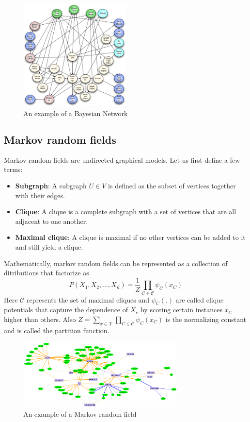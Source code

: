 \documentclass[12pt]{article}
\begin{document}
\begin{figure}[H]
  \centering
    \includegraphics[width=0.50\textwidth]{fig1.jpg}
    \caption{An example of a Bayesian Network\cite{fig1}}
    \label{BN}
\end{figure}

\subsection{Markov random fields}
Markov random fields are undirected graphical models. Let us first define a few terms:
\begin{itemize}
\item \textbf{Subgraph}: A subgraph $U\in V$ is defined as the subset of vertices together with their edges.
\item \textbf{Clique}: A clique is a complete subgraph with a set of vertices that are all adjacent to one another.
\item \textbf{Maximal clique}: A clique is maximal if no other vertices can be added to it and still yield a clique.
\end{itemize}
Mathematically, markov random fields can be represented as a collection of ditributions that factorize as \[P(X_1,X_2,..., X_n)=\dfrac{1}{Z}\prod\limits_{C\in\mathcal{C}}\psi_C(x_C)\] Here $\mathcal{C}$ represents the set of maximal cliques and $\psi_C(.)$ are called clique potentials that capture the dependence of $X_c$ by scoring certain instances $x_C$ higher than others. Also $Z=\sum\limits_{x\in \mathcal{X}}\prod\limits_{C\in\mathcal{C}}\psi_C(x_C)$ is the normalizing constant and is called the partition function.

\begin{figure}[H]
  \centering
    \includegraphics[width=0.75\textwidth]{fig2.png}
    \caption{An example of a Markov random field\cite{fig2}}
    \label{MRF}
\end{figure}
\end{document}
